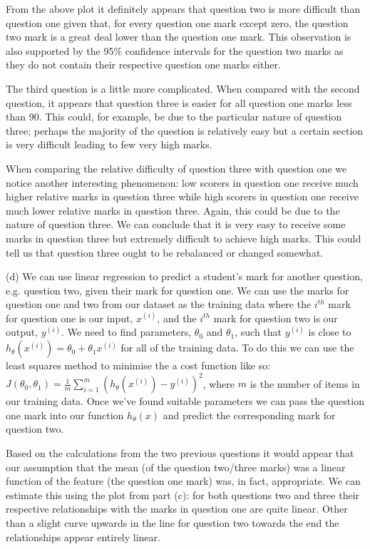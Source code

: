 \documentclass[10pt]{article}
\begin{document}
From the above plot it definitely appears that question two is more difficult than question one given that, for every question one mark except zero, the question two mark is a great deal lower than the question one mark. This observation is also supported by the 95\% confidence intervals for the question two marks as they do not contain their respective question one marks either.

The third question is a little more complicated. When compared with the second question, it appears that question three is easier for all question one marks less than 90. This could, for example, be due to the particular nature of question three; perhaps the majority of the question is relatively easy but a certain section is very difficult leading to few very high marks.

When comparing the relative difficulty of question three with question one we notice another interesting phenomenon: low scorers in question one receive much higher relative marks in question three while high scorers in question one receive much lower relative marks in question three. Again, this could be due to the nature of question three. We can conclude that it is very easy to receive some marks in question three but extremely difficult to achieve high marks. This could tell us that question three ought to be rebalanced or changed somewhat.

\noindent (d) We can use linear regression to predict a student's mark for another question, e.g. question two, given their mark for question one. We can use the marks for question one and two from our dataset as the training data where the $i^{th}$ mark for question one is our input, $x^{(i)}$, and the $i^{th}$ mark for question two is our output, $y^{(i)}$. We need to find parameters, $\theta_0$ and $\theta_1$, such that $y^{(i)}$ is close to $h_{\theta}(x^{(i)}) = \theta_0 + \theta_1 x^{(i)}$ for all of the training data. To do this we can use the least squares method to minimise the a cost function like so: $J(\theta_0, \theta_1) = \frac{1}{m} \sum_{i=1}^m \left( h_{\theta}(x^{(i)}) - y^{(i)} \right)^2$, where $m$ is the number of items in our training data. Once we've found suitable parameters we can pass the question one mark into our function $h_{\theta}(x)$ and predict the corresponding mark for question two.

Based on the calculations from the two previous questions it would appear that our assumption that the mean (of the question two/three marks) was a linear function of the feature (the question one mark) was, in fact, appropriate. We can estimate this using the plot from part (c): for both questions two and three their respective relationships with the marks in question one are quite linear. Other than a slight curve upwards in the line for question two towards the end the relationships appear entirely linear.
\end{document}
